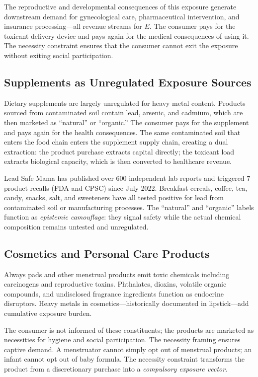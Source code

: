 The reproductive and developmental consequences of this exposure generate downstream demand for gynecological care, pharmaceutical intervention, and insurance processing---all revenue streams for $E$. The consumer pays for the toxicant delivery device and pays again for the medical consequences of using it. The necessity constraint ensures that the consumer cannot exit the exposure without exiting social participation.

\subsection{Supplements as Unregulated Exposure Sources}

Dietary supplements are largely unregulated for heavy metal content. Products sourced from contaminated soil contain lead, arsenic, and cadmium, which are then marketed as ``natural'' or ``organic.'' The consumer pays for the supplement and pays again for the health consequences. The same contaminated soil that enters the food chain enters the supplement supply chain, creating a dual extraction: the product purchase extracts capital directly; the toxicant load extracts biological capacity, which is then converted to healthcare revenue.

Lead Safe Mama has published over 600 independent lab reports and triggered 7 product recalls (FDA and CPSC) since July 2022. Breakfast cereals, coffee, tea, candy, snacks, salt, and sweeteners have all tested positive for lead from contaminated soil or manufacturing processes. The ``natural'' and ``organic'' labels function as \textit{epistemic camouflage}: they signal safety while the actual chemical composition remains untested and unregulated.

\subsection{Cosmetics and Personal Care Products}

Always pads and other menstrual products emit toxic chemicals including carcinogens and reproductive toxins. Phthalates, dioxins, volatile organic compounds, and undisclosed fragrance ingredients function as endocrine disruptors. Heavy metals in cosmetics---historically documented in lipstick---add cumulative exposure burden.

The consumer is not informed of these constituents; the products are marketed as necessities for hygiene and social participation. The necessity framing ensures captive demand. A menstruator cannot simply opt out of menstrual products; an infant cannot opt out of baby formula. The necessity constraint transforms the product from a discretionary purchase into a \textit{compulsory exposure vector}.

